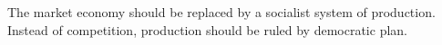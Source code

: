 The market economy should be replaced by a socialist system of production.
Instead of competition, production should be ruled by democratic plan.